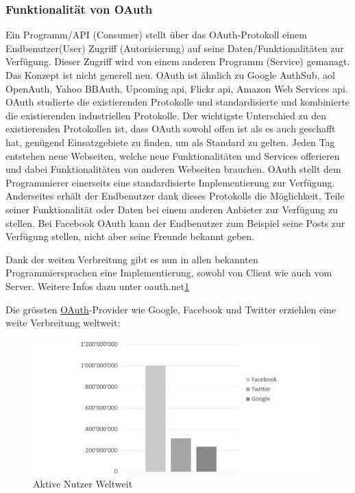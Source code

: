 \subsubsection{Funktionalität von
OAuth}\label{funktionalituxe4t-von-oauth}

Ein Programm/API (Consumer) stellt über das OAuth-Protokoll einem
Endbenutzer(User) Zugriff (Autorisierung) auf seine
Daten/Funktionalitäten zur Verfügung. Dieser Zugriff wird von einem
anderen Programm (Service) gemanagt. Das Konzept ist nicht generell neu.
OAuth ist ähnlich zu Google AuthSub, aol OpenAuth, Yahoo BBAuth,
Upcoming api, Flickr api, Amazon Web Services api. OAuth studierte die
existierenden Protokolle und standardisierte und kombinierte die
existierenden industriellen Protokolle. Der wichtigste Unterschied zu
den existierenden Protokollen ist, dass OAuth sowohl offen ist als es
auch geschafft hat, genügend Einsatzgebiete zu finden, um als Standard
zu gelten. Jeden Tag entstehen neue Webseiten, welche neue
Funktionalitäten und Services offerieren und dabei Funktionalitäten von
anderen Webseiten brauchen. OAuth stellt dem Programmierer einerseits
eine standardisierte Implementierung zur Verfügung. Anderseites erhält
der Endbenutzer dank dieses Protokolls die Möglichkeit, Teile seiner
Funktionalität oder Daten bei einem anderen Anbieter zur Verfügung zu
stellen. Bei Facebook OAuth kann der Endbenutzer zum Beispiel seine
Posts zur Verfügung stellen, nicht aber seine Freunde bekannt geben.

Dank der weiten Verbreitung gibt es nun in allen bekannten
Programmiersprachen eine Implementierung, sowohl von Client wie auch vom
Server. Weitere Infos dazu unter oauth.net\href{http://oauth.net/2/}{1}

Die grössten \protect\hyperlink{oauth-1}{OAuth}-Provider wie Google,
Facebook und Twitter erziehlen eine weite Verbreitung weltweit:

\begin{figure}[htbp]
\centering
\includegraphics{images/excel-statistik/socialmedia-aktivenutzer.jpg}
\caption[Aktive Nutzer Weltweit ]{Aktive Nutzer Weltweit
\footnotemark{}}
\end{figure}


